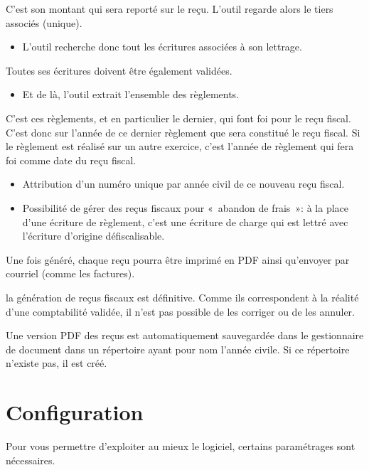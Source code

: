 \documentclass[a4paper,10pt,oneside,french]{sphinxmanual}
\begin{document}
C’est son montant qui sera reporté sur le reçu.
L’outil regarde alors le tiers associés (unique).
\begin{itemize}
\item {} 
L’outil recherche donc tout les écritures associées à son lettrage.

\end{itemize}

Toutes ses écritures doivent être également validées.
\begin{itemize}
\item {} 
Et de là, l’outil extrait l’ensemble des règlements.

\end{itemize}

C’est ces règlements, et en particulier le dernier, qui font foi pour le reçu fiscal.
C’est donc sur l’année de ce dernier règlement que sera constitué le reçu fiscal.
Si le règlement est réalisé sur un autre exercice, c’est l’année de règlement qui fera foi comme date du reçu fiscal.
\begin{itemize}
\item {} 
Attribution d’un numéro unique par année civil de ce nouveau reçu fiscal.

\item {} 
Possibilité de gérer des reçus fiscaux pour « abandon de frais »: à la place d’une écriture de règlement, c’est une écriture de charge qui est lettré avec l’écriture d’origine défiscalisable.

\end{itemize}

Une fois généré, chaque reçu pourra être imprimé en PDF ainsi qu’envoyer par courriel (comme les factures).

 la génération de reçus fiscaux est définitive. Comme ils correspondent à la réalité d’une comptabilité validée, il n’est pas possible de les corriger ou de les annuler.

 Une version PDF des reçus est automatiquement sauvegardée dans le gestionnaire de document dans un répertoire ayant pour nom l’année civile. Si ce répertoire n’existe pas, il est créé.


\section{Configuration}
\label{\detokenize{member/config:configuration}}\label{\detokenize{member/config::doc}}
Pour vous permettre d’exploiter au mieux le logiciel, certains paramétrages sont nécessaires.
\end{document}
